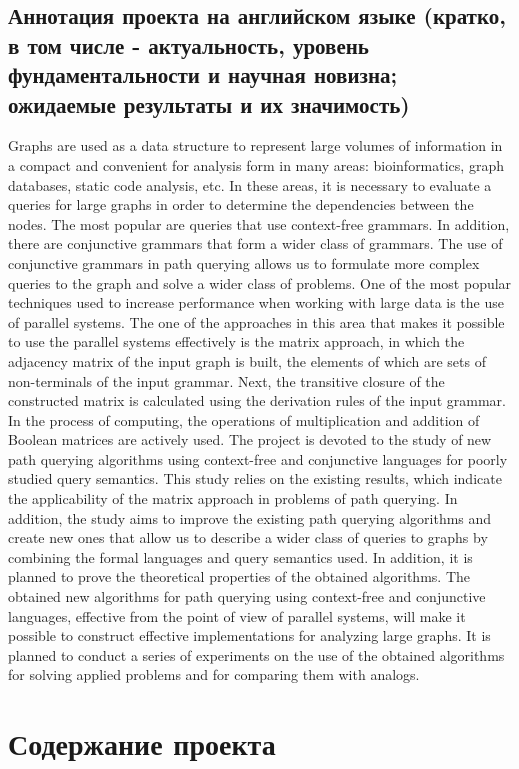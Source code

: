 \documentclass[12pt]{article}  %
\theoremstyle{remark}
\begin{document}
\subsection{Аннотация проекта на английском языке (кратко, в том числе - актуальность, уровень фундаментальности и научная новизна; ожидаемые результаты и их значимость)}
Graphs are used as a data structure to represent large volumes of information in a compact and convenient for analysis form in many areas: bioinformatics, graph databases, static code analysis, etc. In these areas, it is necessary to evaluate a queries for large graphs in order to determine the dependencies between the nodes. The most popular are queries that use context-free grammars. In addition, there are conjunctive grammars that form a wider class of grammars. The use of conjunctive grammars in path querying allows us to formulate more complex queries to the graph and solve a wider class of problems. One of the most popular techniques used to increase performance when working with large data is the use of parallel systems. The one of the approaches in this area that makes it possible to use the parallel systems effectively is the matrix approach, in which the adjacency matrix of the input graph is built, the elements of which are sets of non-terminals of the input grammar. Next, the transitive closure of the constructed matrix is calculated using the derivation rules of the input grammar. In the process of computing, the operations of multiplication and addition of Boolean matrices are actively used. The project is devoted to the study of new path querying algorithms using context-free and conjunctive languages for poorly studied query semantics. This study relies on the existing results, which indicate the applicability of the matrix approach in problems of path querying. In addition, the study aims to improve the existing path querying algorithms and create new ones that allow us to describe a wider class of queries to graphs by combining the formal languages and query semantics used. In addition, it is planned to prove the theoretical properties of the obtained algorithms. The obtained new algorithms for path querying using context-free and conjunctive languages, effective from the point of view of parallel systems, will make it possible to construct effective implementations for analyzing large graphs. It is planned to conduct a series of experiments on the use of the obtained algorithms for solving applied problems and for comparing them with analogs.

\section{Содержание проекта}
\end{document}
